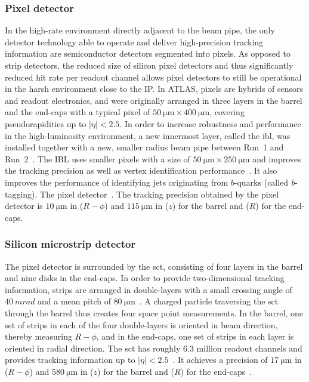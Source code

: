\subsubsection{Pixel detector}

In the high-rate environment directly adjacent to the beam pipe, the only detector technology able to operate and deliver high-precision tracking information are semiconductor detectors segmented into pixels. As opposed to strip detectors, the reduced size of silicon pixel detectors and thus significantly reduced hit rate per readout channel allows pixel detectors to still be operational in the harsh environment close to the IP. In ATLAS, pixels are hybrids of sensors and readout electronics, and were originally arranged in three layers in the barrel and the end-caps with a typical pixel of $\SI{50}{\micro\meter}\times \SI{400}{\micro\meter}$, covering pseudorapidities up to $\vert\eta\vert < 2.5$. In order to increase robustness  and performance in the high-luminosity environment, a new innermost layer, called the \gls{ibl}, was installed together with a new, smaller radius beam pipe between Run~1 and Run~2~\cite{Abbott:2018ikt,Capeans:1291633}. The IBL uses smaller pixels with a size of $\SI{50}{\micro\meter}\times \SI{250}{\micro\meter}$ and improves the tracking precision as well as vertex identification performance~\cite{Capeans:1291633}. It also improves the performance of identifying jets originating from $b$-quarks (called \textit{b}-tagging). The pixel detector~\cite{Aad:2019aic}. The tracking precision obtained by the pixel detector is $\SI{10}{\micro\meter}$ in ($R-\phi$) and $\SI{115}{\micro\meter}$ in ($z$) for the barrel and ($R$) for the end-caps.

\subsubsection{Silicon microstrip detector}

The pixel detector is surrounded by the \gls{sct}, consisting of four layers in the barrel and nine disks in the end-caps. In order to provide two-dimensional tracking information, strips are arranged in double-layers with a small crossing angle of $\SI{40}{mrad}$ and a mean pitch of $\SI{80}{\micro\meter}$~\cite{Aad:2008zzm}. A charged particle traversing the \gls{sct} through the barrel thus creates four space point measurements. In the barrel, one set of strips in each of the four double-layers is oriented in beam direction, thereby measuring $R-\phi$, and in the end-caps, one set of strips in each layer is oriented in radial direction. The \gls{sct} has roughly $6.3$ million readout channels and provides tracking information up to $\vert\eta\vert <2.5$~\cite{Aad:2008zzm}. It achieves a precision of $\SI{17}{\micro\meter}$ in ($R-\phi$) and $\SI{580}{\micro\meter}$ in ($z$) for the barrel and ($R$) for the end-caps~\cite{Aad:2008zzm}.

